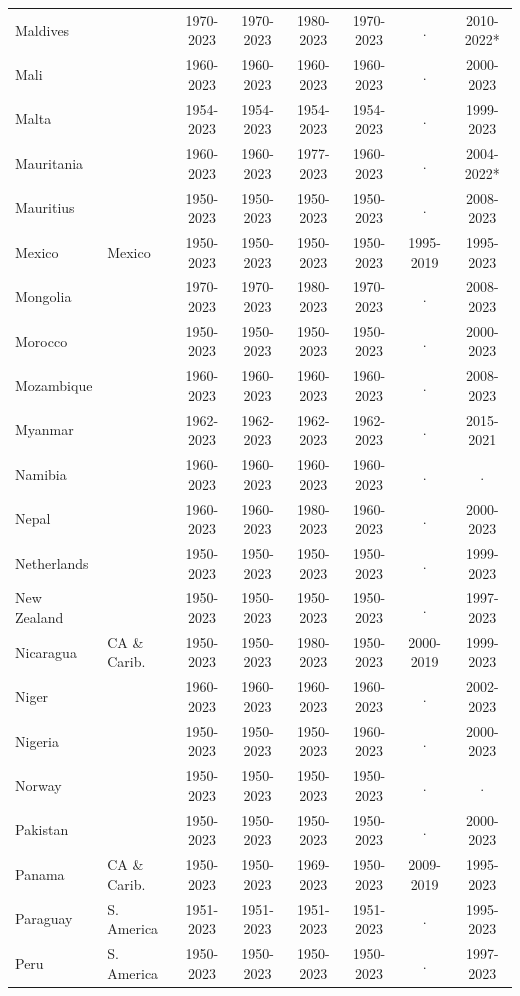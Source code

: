\begin{longtable}{ll*{6}{c}}
Maldives &  & 1970-2023 & 1970-2023 & 1980-2023 & 1970-2023 & . & 2010-2022* \\
Mali &  & 1960-2023 & 1960-2023 & 1960-2023 & 1960-2023 & . & 2000-2023 \\
Malta &  & 1954-2023 & 1954-2023 & 1954-2023 & 1954-2023 & . & 1999-2023 \\
Mauritania &  & 1960-2023 & 1960-2023 & 1977-2023 & 1960-2023 & . & 2004-2022* \\
Mauritius &  & 1950-2023 & 1950-2023 & 1950-2023 & 1950-2023 & . & 2008-2023 \\
Mexico & Mexico & 1950-2023 & 1950-2023 & 1950-2023 & 1950-2023 & 1995-2019 & 1995-2023 \\
Mongolia &  & 1970-2023 & 1970-2023 & 1980-2023 & 1970-2023 & . & 2008-2023 \\
Morocco &  & 1950-2023 & 1950-2023 & 1950-2023 & 1950-2023 & . & 2000-2023 \\
Mozambique &  & 1960-2023 & 1960-2023 & 1960-2023 & 1960-2023 & . & 2008-2023 \\
Myanmar &  & 1962-2023 & 1962-2023 & 1962-2023 & 1962-2023 & . & 2015-2021 \\
Namibia &  & 1960-2023 & 1960-2023 & 1960-2023 & 1960-2023 & . & . \\
Nepal &  & 1960-2023 & 1960-2023 & 1980-2023 & 1960-2023 & . & 2000-2023 \\
Netherlands &  & 1950-2023 & 1950-2023 & 1950-2023 & 1950-2023 & . & 1999-2023 \\
New Zealand &  & 1950-2023 & 1950-2023 & 1950-2023 & 1950-2023 & . & 1997-2023 \\
Nicaragua & CA \& Carib. & 1950-2023 & 1950-2023 & 1980-2023 & 1950-2023 & 2000-2019 & 1999-2023 \\
Niger &  & 1960-2023 & 1960-2023 & 1960-2023 & 1960-2023 & . & 2002-2023 \\
Nigeria &  & 1950-2023 & 1950-2023 & 1950-2023 & 1960-2023 & . & 2000-2023 \\
Norway &  & 1950-2023 & 1950-2023 & 1950-2023 & 1950-2023 & . & . \\
Pakistan &  & 1950-2023 & 1950-2023 & 1950-2023 & 1950-2023 & . & 2000-2023 \\
Panama & CA \& Carib. & 1950-2023 & 1950-2023 & 1969-2023 & 1950-2023 & 2009-2019 & 1995-2023 \\
Paraguay & S. America & 1951-2023 & 1951-2023 & 1951-2023 & 1951-2023 & . & 1995-2023 \\
Peru & S. America & 1950-2023 & 1950-2023 & 1950-2023 & 1950-2023 & . & 1997-2023 \\

\end{longtable}
